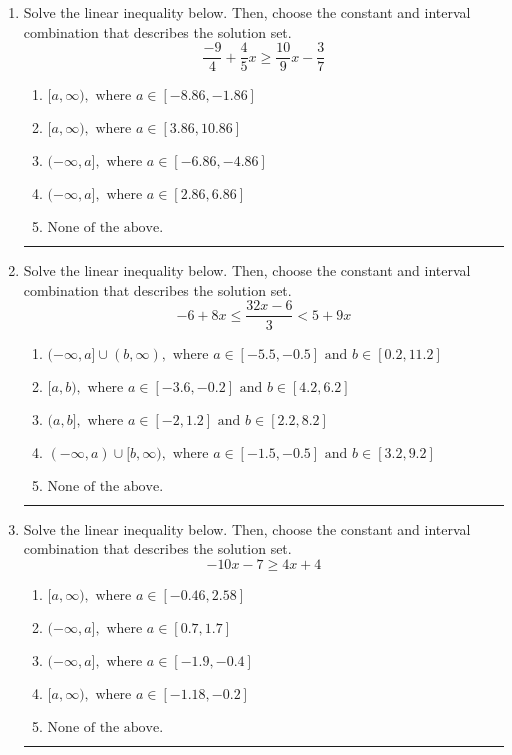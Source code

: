 \documentclass[14pt]{extbook}
\newcommand{\litem}[1]{\item#1\hspace*{-1cm}\rule{\textwidth}{0.4pt}}
\begin{document}
\begin{enumerate}
{\begin{enumerate}[label=\Alph*.]
\end{enumerate} }
\litem{
Solve the linear inequality below. Then, choose the constant and interval combination that describes the solution set.\[ \frac{-9}{4} + \frac{4}{5} x \geq \frac{10}{9} x - \frac{3}{7} \]\begin{enumerate}[label=\Alph*.]
\item \( [a, \infty), \text{ where } a \in [-8.86, -1.86] \)
\item \( [a, \infty), \text{ where } a \in [3.86, 10.86] \)
\item \( (-\infty, a], \text{ where } a \in [-6.86, -4.86] \)
\item \( (-\infty, a], \text{ where } a \in [2.86, 6.86] \)
\item \( \text{None of the above}. \)

\end{enumerate} }
\litem{
Solve the linear inequality below. Then, choose the constant and interval combination that describes the solution set.\[ -6 + 8 x \leq \frac{32 x - 6}{3} < 5 + 9 x \]\begin{enumerate}[label=\Alph*.]
\item \( (-\infty, a] \cup (b, \infty), \text{ where } a \in [-5.5, -0.5] \text{ and } b \in [0.2, 11.2] \)
\item \( [a, b), \text{ where } a \in [-3.6, -0.2] \text{ and } b \in [4.2, 6.2] \)
\item \( (a, b], \text{ where } a \in [-2, 1.2] \text{ and } b \in [2.2, 8.2] \)
\item \( (-\infty, a) \cup [b, \infty), \text{ where } a \in [-1.5, -0.5] \text{ and } b \in [3.2, 9.2] \)
\item \( \text{None of the above.} \)

\end{enumerate} }
\litem{
Solve the linear inequality below. Then, choose the constant and interval combination that describes the solution set.\[ -10x -7 \geq 4x + 4 \]\begin{enumerate}[label=\Alph*.]
\item \( [a, \infty), \text{ where } a \in [-0.46, 2.58] \)
\item \( (-\infty, a], \text{ where } a \in [0.7, 1.7] \)
\item \( (-\infty, a], \text{ where } a \in [-1.9, -0.4] \)
\item \( [a, \infty), \text{ where } a \in [-1.18, -0.2] \)
\item \( \text{None of the above}. \)


\end{enumerate}}
\end{enumerate}
\end{document}
